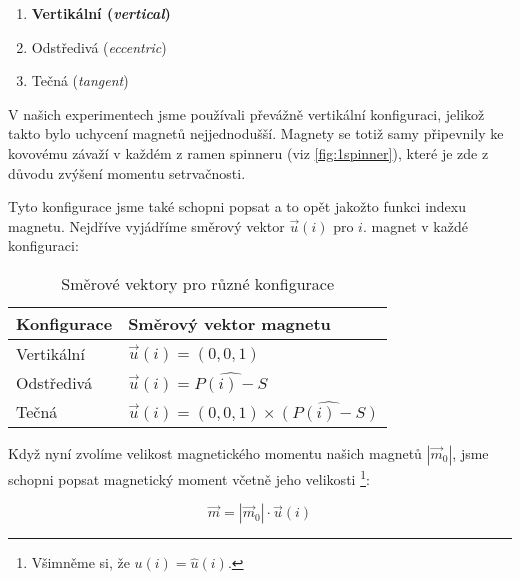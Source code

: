 \documentclass[12pt, a4paper,
 twoside,        %
 openright
]{report}
\begin{document}
\begin{enumerate}[topsep=0pt, partopsep=0pt]
    \setlength{\itemsep}{0pt}%
    \setlength{\parskip}{0pt}%
    \item \textbf{Vertikální (\textit{vertical})}
    \item Odstředivá (\textit{eccentric})
    \item Tečná (\textit{tangent})
\end{enumerate}

V našich experimentech jsme používali převážně vertikální konfiguraci, jelikož takto bylo uchycení magnetů nejjednodušší.
Magnety se totiž samy připevnily ke kovovému závaží v každém z ramen spinneru (viz \autoref{fig:1spinner}), které je zde z důvodu zvýšení momentu setrvačnosti.

Tyto konfigurace jsme také schopni popsat a to opět jakožto funkci indexu magnetu.
Nejdříve vyjádříme směrový vektor $\vec{u}(i)$ pro $i$. magnet v každé konfiguraci:

\vspace{24pt}

\begin{table}[!ht]
    \captionsetup{justification=raggedright,singlelinecheck=off}
    \caption{Směrové vektory pro různé konfigurace}
    \label{tab:mag_dir_vec}

    \def\arraystretch{1.5}
    \begin{tabularx}{\textwidth}{p{} p{} }
        \textbf{Konfigurace} & \textbf{Směrový vektor magnetu}                    \\
        \hline
        Vertikální           & $\vec{u}(i) = (0,0,1)$                             \\
        Odstředivá           & $\vec{u}(i) = \widehat{P(i) - S}$                  \\
        Tečná                & $\vec{u}(i) = (0,0,1) \times \widehat{(P(i) - S)}$ \\
    \end{tabularx}
\end{table}

{\raggedright
Když nyní zvolíme velikost magnetického momentu našich magnetů $|\vec{m}_0|$, jsme schopni popsat magnetický moment včetně jeho velikosti \footnote{Všimněme si, že $u(i) = \hat{u}(i)$.}:}

\begin{equation}
    \label{eq:magnet_moment_orientation}
    \vec{m} = |\vec{m}_0| \cdot \vec{u}(i)
\end{equation}
\end{document}
